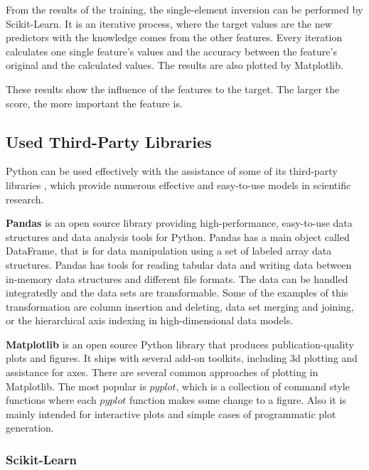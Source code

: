 From the results of the training, the single-element inversion can be performed by Scikit-Learn. It is an iterative process, where the target values are the new predictors with the knowledge comes from the other features. Every iteration calculates one single feature's values and the accuracy between the feature's original and the calculated values. The results are also plotted by Matplotlib. \medskip

These results show the influence of the features to the target. The larger the score, the more important the feature is.



\subsection{Used Third-Party Libraries}

Python can be used effectively with the assistance of some of its third-party libraries \cite{g2015learning} \cite{bressert2012scipy}, which provide numerous effective and easy-to-use models in scientific research. \bigskip

\textbf{Pandas} \cite{chen2017pandas} is an open source library providing high-performance, easy-to-use data structures and data analysis tools for Python. Pandas has a main object called DataFrame, that is for data manipulation using a set of labeled array data structures. Pandas has tools for reading tabular data and writing data between in-memory data structures and different file formats. The data can be handled integratedly and the data sets are transformable. Some of the examples of this transformation are column insertion and deleting, data set merging and joining, or the hierarchical axis indexing in high-dimensional data models.\bigskip


\textbf{Matplotlib} is an open source Python library that produces publication-quality plots and figures. It ships with several add-on toolkits, including 3d plotting and assistance for axes. There are several common approaches of plotting in Matplotlib. The most popular is $pyplot$, which is a collection of command style functions where each $pyplot$ function makes some change to a figure. Also it is mainly intended for interactive plots and simple cases of programmatic plot generation.


\subsubsection{Scikit-Learn}

